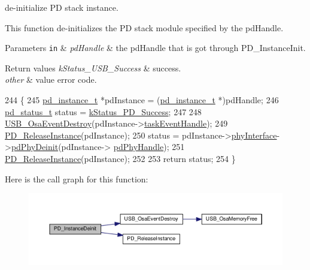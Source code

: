 de-\/initialize P\-D stack instance. 

This function de-\/initializes the P\-D stack module specified by the pd\-Handle.


\begin{DoxyParams}[1]{Parameters}
\mbox{\tt in}  & {\em pd\-Handle} & the pd\-Handle that is got through P\-D\-\_\-\-Instance\-Init.\\
\hline
\end{DoxyParams}

\begin{DoxyRetVals}{Return values}
{\em k\-Status\-\_\-\-U\-S\-B\-\_\-\-Success} & success. \\
\hline
{\em other} & value error code. \\
\hline
\end{DoxyRetVals}

\begin{DoxyCode}
244 \{
245     \hyperlink{struct__pd__instance}{pd\_instance\_t} *pdInstance = (\hyperlink{struct__pd__instance}{pd\_instance\_t} *)pdHandle;
246     \hyperlink{group__usb__pd__stack_ga04a1f331d9807a70ab9bb753f5ed1c80}{pd\_status\_t} status = \hyperlink{group__usb__pd__stack_ggaaad4cd00dd02567c6169429e3a895073acf06f954f9c52f560cea34df48c63555}{kStatus\_PD\_Success};
247 
248     \hyperlink{group__usb__os__abstraction_ga3d07a809b1fa8450c1383aa8bbd49b37}{USB\_OsaEventDestroy}(pdInstance->\hyperlink{struct__pd__instance_ab04e9fcc994b2547509169e07ab21465}{taskEventHandle});
249     \hyperlink{usb__pd__interface_8c_a8c50cfda5ec549f60ac482d06231d26f}{PD\_ReleaseInstance}(pdInstance);
250     status = pdInstance->\hyperlink{struct__pd__instance_adbed7b2cd53df40e0611a8879c903339}{phyInterface}->\hyperlink{struct__pd__phy__api__interface_a9e36ebe547c2ed82866597b2afc54bd0}{pdPhyDeinit}(pdInstance->
      \hyperlink{struct__pd__instance_a7c1184292efe9a5ae30b6ac422c1e9f4}{pdPhyHandle});
251     \hyperlink{usb__pd__interface_8c_a8c50cfda5ec549f60ac482d06231d26f}{PD\_ReleaseInstance}(pdInstance);
252 
253     \textcolor{keywordflow}{return} status;
254 \}
\end{DoxyCode}


Here is the call graph for this function\-:
\nopagebreak
\begin{figure}[H]
\begin{center}
\leavevmode
\includegraphics[width=350pt]{group__usb__pd__stack_ga2a517af9491514966ad9c806eb998f78_cgraph}
\end{center}
\end{figure}




